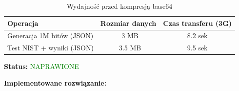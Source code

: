\documentclass[12pt,a4paper]{article}
\begin{document}
\begin{tcolorbox}[colback=violet!5!white,colframe=violet!75!black,title=Optymalizacja Backendu - Priorytet:      
  WYSOKI]
  \begin{table}[H]                                                                                                 
  \centering                                                                                                       
  \begin{tabular}{|l|c|c|}                                                                                         
  \hline                                                                                                           
  \textbf{Operacja} & \textbf{Rozmiar danych} & \textbf{Czas transferu (3G)} \\                                    
  \hline                                                                                                           
  Generacja 1M bitów (JSON) & ~3 MB & 8.2 sek \\                                                                   
  \hline                                                                                                           
  Test NIST + wyniki (JSON) & ~3.5 MB & 9.5 sek \\                                                                 
  \hline                                                                                                           
  \end{tabular}                                                                                                    
  \caption{Wydajność przed kompresją base64}                                                                       
  \end{table}                                                                                                      
                                                                                                                   
  \textbf{Status:} \textcolor{green}{NAPRAWIONE}                                                                   
                                                                                                                   
  \textbf{Implementowane rozwiązanie:}                                                                             
                                                                                                                   

\end{tcolorbox}
\end{document}
